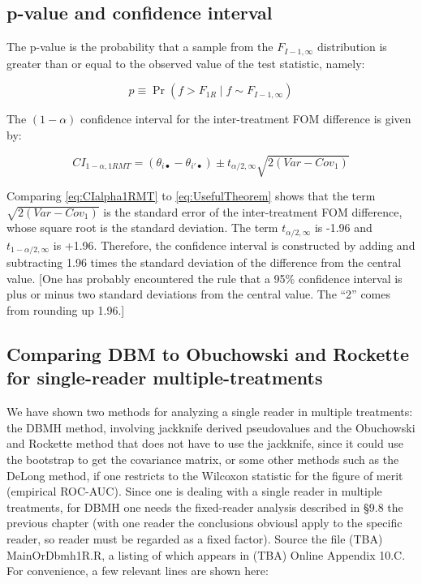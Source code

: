 \documentclass[
]{book}
\begin{document}
\hypertarget{p-value-and-confidence-interval}{%
\subsection{p-value and confidence interval}\label{p-value-and-confidence-interval}}

The p-value is the probability that a sample from the \(F_{I-1,\infty}\) distribution is greater than or equal to the observed value of the test statistic, namely:

\begin{equation}
p\equiv \Pr(f>F_{1R} \mid f \sim F_{I-1,\infty})
\label{eq:pValue1RMT}
\end{equation}

The \((1-\alpha)\) confidence interval for the inter-treatment FOM difference is given by:

\begin{equation}
CI_{1-\alpha,1RMT} = (\theta_{i\bullet} - \theta_{i'\bullet}) \pm t_{\alpha/2,\infty} \sqrt{2(Var-Cov_1)}
\label{eq:CIalpha1RMT}
\end{equation}

Comparing \eqref{eq:CIalpha1RMT} to \eqref{eq:UsefulTheorem} shows that the term \(\sqrt{2(Var-Cov_1)}\) is the standard error of the inter-treatment FOM difference, whose square root is the standard deviation. The term \(t_{\alpha/2,\infty}\) is -1.96 and \(t_{1-\alpha/2,\infty}\) is +1.96. Therefore, the confidence interval is constructed by adding and subtracting 1.96 times the standard deviation of the difference from the central value. {[}One has probably encountered the rule that a 95\% confidence interval is plus or minus two standard deviations from the central value. The ``2'' comes from rounding up 1.96.{]}

\hypertarget{comparing-dbm-to-obuchowski-and-rockette-for-single-reader-multiple-treatments}{%
\subsection{Comparing DBM to Obuchowski and Rockette for single-reader multiple-treatments}\label{comparing-dbm-to-obuchowski-and-rockette-for-single-reader-multiple-treatments}}

We have shown two methods for analyzing a single reader in multiple treatments: the DBMH method, involving jackknife derived pseudovalues and the Obuchowski and Rockette method that does not have to use the jackknife, since it could use the bootstrap to get the covariance matrix, or some other methods such as the DeLong method, if one restricts to the Wilcoxon statistic for the figure of merit (empirical ROC-AUC). Since one is dealing with a single reader in multiple treatments, for DBMH one needs the fixed-reader analysis described in §9.8 the previous chapter (with one reader the conclusions obviousl apply to the specific reader, so reader must be regarded as a fixed factor). Source the file (TBA) MainOrDbmh1R.R, a listing of which appears in (TBA) Online Appendix 10.C. For convenience, a few relevant lines are shown here:
\end{document}
